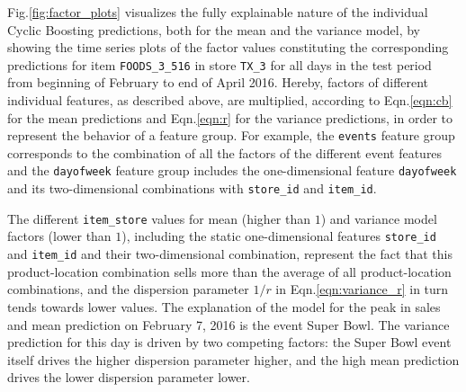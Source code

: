 \documentclass[BCOR=1mm, DIV=calc,10pt,
twoside=true,
twocolumn,
headings=normal]{scrartcl}
\newcommand{\fig}{Fig.}
\newcommand{\eqn}{Eqn.}
\begin{document}
\fig \ref{fig:factor_plots} visualizes the fully explainable nature of the individual Cyclic Boosting predictions, both for the mean and the variance model, by showing the time series plots of the factor values constituting the corresponding predictions for item \texttt{FOODS\_3\_516} in store \texttt{TX\_3} for all days in the test period from beginning of February to end of April 2016. Hereby, factors of different individual features, as described above, are multiplied, according to \eqn \eqref{eqn:cb} for the mean predictions and \eqn \eqref{eqn:r} for the variance predictions, in order to represent the behavior of a feature group. For example, the \texttt{events} feature group corresponds to the combination of all the factors of the different event features and the \texttt{dayofweek} feature group includes the one-dimensional feature \texttt{dayofweek} and its two-dimensional combinations with \texttt{store\_id} and \texttt{item\_id}.

\noindent
The different \texttt{item\_store} values for mean (higher than $1$) and variance model factors (lower than $1$), including the static one-dimensional features \texttt{store\_id} and \texttt{item\_id} and their two-dimensional combination, represent the fact that this product-location combination sells more than the average of all product-location combinations, and the dispersion parameter $1/r$ in \eqn \eqref{eqn:variance_r} in turn tends towards lower values. The explanation of the model for the peak in sales and mean prediction on February 7, 2016 is the event Super Bowl. The variance prediction for this day is driven by two competing factors:  the Super Bowl event itself drives  the  higher dispersion parameter higher, and the high mean prediction drives the lower dispersion parameter lower.
\end{document}
